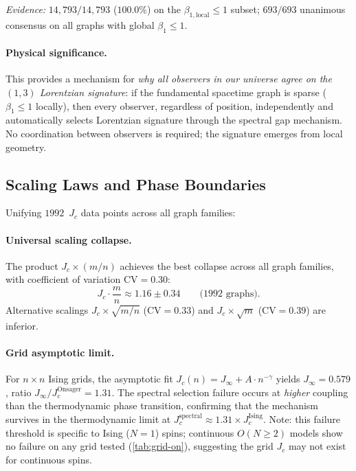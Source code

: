 \documentclass[11pt]{article}
\theoremstyle{definition}
\theoremstyle{remark}
\begin{document}
\noindent\emph{Evidence:} $14{,}793/14{,}793$ ($100.0\%$) on the $\beta_{1,\mathrm{local}} \leq 1$
subset; $693/693$ unanimous consensus on all graphs with global $\beta_1 \leq 1$.

\paragraph{Physical significance.}
This provides a mechanism for \emph{why all observers in our universe agree
on the $(1,3)$ Lorentzian signature}: if the fundamental spacetime graph is
sparse ($\beta_1 \leq 1$ locally), then every observer, regardless of position,
independently and automatically selects Lorentzian signature through the
spectral gap mechanism. No coordination between observers is required;
the signature emerges from local geometry.

\subsection{Scaling Laws and Phase Boundaries}
\label{sec:scaling}

Unifying $1992$~$J_c$ data points across all graph families:

\paragraph{Universal scaling collapse.}
The product $J_c \times (m/n)$ achieves the best collapse across all graph
families, with coefficient of variation $\mathrm{CV} = 0.30$:
\begin{equation}
  J_c \cdot \frac{m}{n} \approx 1.16 \pm 0.34 \qquad \text{(1992 graphs)}.
  \label{eq:scaling-collapse}
\end{equation}
Alternative scalings $J_c \times \sqrt{m/n}$ ($\mathrm{CV} = 0.33$) and
$J_c \times \sqrt{m}$ ($\mathrm{CV} = 0.39$) are inferior.

\paragraph{Grid asymptotic limit.}
For $n \times n$ Ising grids, the asymptotic fit $J_c(n) = J_\infty +
A \cdot n^{-\gamma}$ yields $J_\infty = 0.579$, ratio
$J_\infty / J_c^{\mathrm{Onsager}} = 1.31$. The spectral selection
failure occurs at \emph{higher} coupling than the thermodynamic phase
transition, confirming that the mechanism survives in the thermodynamic
limit at $J_c^{\mathrm{spectral}} \approx 1.31 \times J_c^{\mathrm{Ising}}$.
Note: this failure threshold is specific to Ising ($N = 1$) spins;
continuous $O(N \geq 2)$ models show no failure on any grid tested
(\cref{tab:grid-on}), suggesting the grid $J_c$ may not exist for
continuous spins.
\end{document}
